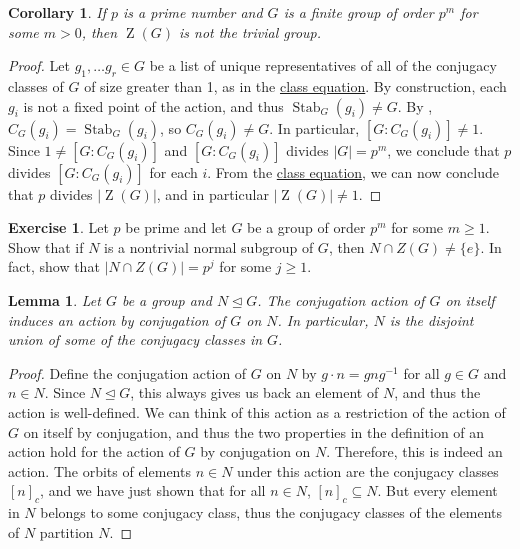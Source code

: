 \documentclass[12pt]{report}
\newtheorem{lemma}[theorem]{Lemma}
\newtheorem{corollary}[theorem]{Corollary}
\numberwithin{equation}{section}
\numberwithin{theorem}{chapter}
\theoremstyle{definition}
\newtheorem{exercise}{Exercise}
\newtheorem*{basic properties}{Basic Properties}
\newtheorem*{Important Remark}{Important Remark}
\def\norm{\mathrel{\unlhd}}
\DeclareMathOperator{\Zc}{Z}
\DeclareMathOperator{\Stab}{Stab}
\begin{document}
\begin{corollary}
If $p$ is a prime number and $G$ is a finite group of order $p^m$ for some $m > 0$, then $\Zc(G)$ is not the trivial group.
\end{corollary}

\begin{proof}
Let $g_1,\ldots g_r \in G$ be a list of unique representatives of all of the conjugacy classes of $G$ of size greater than 1, as in the \hyperref[Class Equation]{class equation}. By construction, each $g_i$ is not a fixed point of the action, and thus $\Stab_G(g_i) \neq G$. By , $C_G(g_i) = \Stab_G(g_i)$, so $C_G(g_i) \neq G$. In particular, $[G:C_G(g_i)]\neq 1$. Since $1\neq [G:C_G(g_i)]$ and $[G:C_G(g_i)]$ divides $|G|=p^m$, we conclude that $p$ divides $[G:C_G(g_i)]$ for each $i$. From the \hyperref[Class Equation]{class equation}, we can now conclude that $p$ divides $|\Zc(G)|$, and in particular $|\Zc(G)|\neq 1$.
\end{proof}





\begin{exercise}
Let $p$ be prime and let $G$ be a group of order $p^m$ for some $m \geqslant 1$. Show that if $N$ is a nontrivial normal subgroup of $G$, then $N \cap Z(G) \ne \{e\}$. In fact, show that $|N \cap Z(G)| = p^j$ for some $j \geqslant 1$. 
\end{exercise}



\begin{lemma}\label{conjugation descends to normal subgroups}
Let $G$ be a group and $N\norm G$. The conjugation action of $G$ on itself induces an action by conjugation of $G$ on $N$. In particular, $N$ is the disjoint union of some of the conjugacy classes in $G$.
\end{lemma}


\begin{proof}
Define the conjugation action of $G$ on $N$ by $g\cdot n=gng^{-1}$ for all $g\in G$ and $n\in N$. Since $N\norm G$, this always gives us back an element of $N$, and thus the action is well-defined. We can think of this action as a restriction of the action of $G$ on itself by conjugation, and thus the two properties in the definition of an action hold for the action of $G$ by conjugation on $N$. Therefore, this is indeed an action. The orbits of elements $n\in N$ under this action are the conjugacy classes $[n]_c$, and we have just shown that for all $n \in N$, $[n]_c \subseteq N$. But every element in $N$ belongs to some conjugacy class, thus the conjugacy classes of the elements of $N$ partition $N$.
\end{proof}
\end{document}
